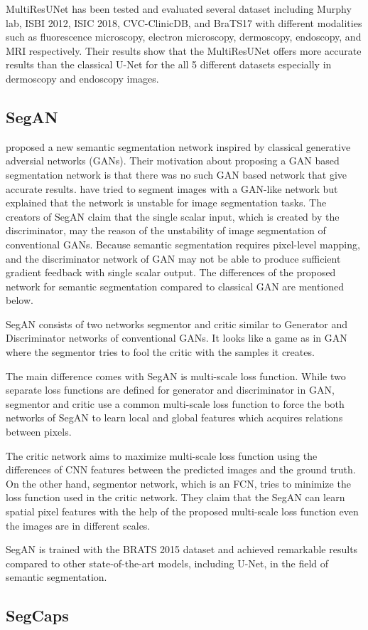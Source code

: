         

        MultiResUNet has been tested and evaluated several dataset including Murphy lab, ISBI 2012, ISIC 2018, CVC-ClinicDB, and BraTS17
        with different modalities such as fluorescence microscopy, electron microscopy, dermoscopy, endoscopy, and MRI respectively.
        Their results show that the MultiResUNet offers more accurate results than the classical U-Net for the all 5 different datasets especially in dermoscopy and endoscopy images.

    \subsection{SegAN}\label{sec:segan}

        \citet{xue2018segan} proposed a new semantic segmentation network inspired by classical generative adversial networks (GANs).
        Their motivation about proposing a GAN based segmentation network is that there was no such GAN based network that give accurate results.
        \citet{luc2016semantic} have tried to segment images with a GAN-like network but explained that the network is unstable for image segmentation tasks.
        The creators of SegAN claim that the single scalar input, which is created by the discriminator,  may the reason of the unstability of image segmentation of conventional GANs.
        Because semantic segmentation requires pixel-level mapping, and the discriminator network of GAN may not be able to produce sufficient gradient feedback with single scalar output.
        The differences of the proposed network for semantic segmentation compared to classical GAN ​​are mentioned below.

        SegAN consists of two networks segmentor and critic similar to Generator and Discriminator networks of conventional GANs.
        It looks like a game as in GAN where the segmentor tries to fool the critic with the samples it creates.

        

        The main difference comes with SegAN is multi-scale loss function. While two separate loss functions are defined for generator and discriminator in GAN,
        segmentor and critic use a common multi-scale loss function to force the both networks of SegAN to learn local and global features which acquires relations between pixels.

        The critic network aims to maximize multi-scale loss function using the differences of CNN features between the predicted images and the ground truth.
        On the other hand, segmentor network, which is an FCN, tries to minimize the loss function used in the critic network.
        They claim that the SegAN can learn spatial pixel features with the help of the proposed multi-scale loss function even the images are in different scales.

        SegAN is trained with the BRATS 2015 dataset and achieved remarkable results compared to other state-of-the-art models, including U-Net, in the field of semantic segmentation.

    \subsection{SegCaps}
